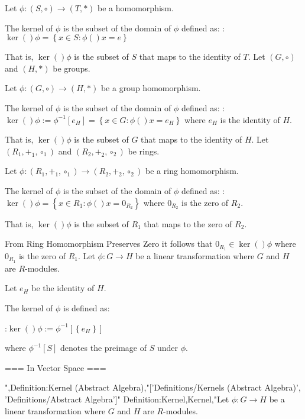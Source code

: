 Let $\phi: \left( S, \circ \right) \to \left( T, * \right)$ be a homomorphism.


The kernel of $\phi$ is the subset of the domain of $\phi$ defined as:
:$\ker \left(   \right)\phi = \left\lbrace x \in S: \phi \left(   \right)x = e \right\rbrace$


That is, $\ker \left(   \right)\phi$ is the subset of $S$ that maps to the identity of $T$.
Let $\left( G, \circ \right)$ and $\left( H, * \right)$ be groups.

Let $\phi: \left( G, \circ \right) \to \left( H, * \right)$ be a group homomorphism.


The kernel of $\phi$ is the subset of the domain of $\phi$ defined as:
:$\ker \left(   \right)\phi := \phi^{-1} \left[ e_H \right] = \left\lbrace x \in G: \phi \left(   \right)x = e_H \right\rbrace$
where $e_H$ is the identity of $H$.


That is, $\ker \left(   \right)\phi$ is the subset of $G$ that maps to the identity of $H$.
Let $\left( R_1, +_1, \circ_1 \right)$ and $\left( R_2, +_2, \circ_2 \right)$ be rings.

Let $\phi: \left( R_1, +_1, \circ_1 \right) \to \left( R_2, +_2, \circ_2 \right)$ be a ring homomorphism.


The kernel of $\phi$ is the subset of the domain of $\phi$ defined as:
:$\ker \left(   \right)\phi = \left\lbrace x \in R_1: \phi \left(   \right)x = 0_{R_2}  \right\rbrace$
where $0_{R_2}$ is the zero of $R_2$.


That is, $\ker \left(   \right)\phi$ is the subset of $R_1$ that maps to the zero of $R_2$.


From Ring Homomorphism Preserves Zero it follows that $0_{R_1} \in \ker \left(   \right)\phi$ where $0_{R_1}$ is the zero of $R_1$.
Let $\phi: G \to H$ be a linear transformation where $G$ and $H$ are $R$-modules.

Let $e_H$ be the identity of $H$.


The kernel of $\phi$ is defined as:

:$\ker \left(   \right)\phi := \phi^{-1} \left[ \left\lbrace e_H \right\rbrace  \right]$

where $\phi^{-1} \left[ S \right]$ denotes the preimage of $S$ under $\phi$.


=== In Vector Space ===

",Definition:Kernel (Abstract Algebra),"['Definitions/Kernels (Abstract Algebra)', 'Definitions/Abstract Algebra']"
Definition:Kernel,Kernel,"Let $\phi: G \to H$ be a linear transformation where $G$ and $H$ are $R$-modules.


